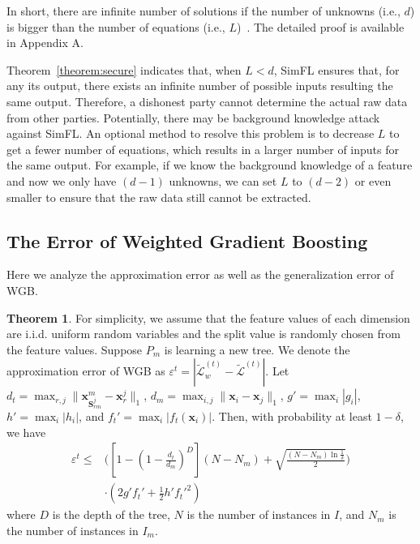 \documentclass[letterpaper]{article} %
\theoremstyle{definition}
\newtheorem{theorem}{Theorem}
\newcommand\norm[1]{\lVert#1\rVert}
\newcommand{\mtx}[1]{\ensuremath{\mathbf{#1}}}
\begin{document}
In short, there are infinite number of solutions if the number of unknowns (i.e., $d$) is bigger than the number of equations (i.e., $L$)~\cite{ladyzhenskaia1968linear}. The detailed proof is available in Appendix A.

Theorem~\ref{theorem:secure} indicates that, when $L<d$, SimFL ensures that, for any its output, there exists an infinite number of possible inputs resulting the same output. Therefore, a dishonest party cannot determine the actual raw data from other parties. Potentially, there may be background knowledge attack against SimFL. An optional method to resolve this problem is to decrease $L$ to get a fewer number of equations, which results in a larger number of inputs for the same output. For example, if we know the background knowledge of a feature and now we only have $(d-1)$ unknowns, we can set $L$ to $(d-2)$ or even smaller to ensure that the raw data  still cannot be extracted.

\subsection{The Error of Weighted Gradient Boosting}
\label{sec:error_formula}
Here we analyze the approximation error as well as the generalization error of WGB.
\begin{theorem}
\label{theorem:upperbound}
For simplicity, we assume that the feature values of each dimension are i.i.d. uniform random variables and the split value is randomly chosen from the feature values. Suppose $P_m$ is learning a new tree. We denote the approximation error of WGB as $\varepsilon^t = |\mathcal{\tilde{L}}_w^{(t)} - \mathcal{\tilde{L}}^{(t)}|$. Let $d_t = \max_{r,j}\norm{\mathbf{x}_{\mtx{S}_{rm}^j}^m-\mathbf{x}_r^j}_1$, $d_{m} = \max_{i,j}\norm{\mathbf{x}_i- \mathbf{x}_j}_1$, $g'=\max_i |g_i|$, $h'=\max_i |h_i|$, and $f_t'=\max_i |f_t(\mathbf{x}_i)|$. Then, with probability at least $1-\delta$, we have
\begin{equation}
\begin{aligned}
\label{eq:upperbound}
    \varepsilon^t \leq &\Big([1-(1-\frac{d_t}{d_m})^D](N-N_m)+\sqrt{\frac{(N-N_m)\ln{\frac{1}{\delta}}}{2}}\Big) \\
    & \cdot (2g' f_t'+\frac{1}{2}h' f_t'^2)
\end{aligned}
\end{equation}
where $D$ is the depth of the tree, $N$ is the number of instances in $I$, and $N_m$ is the number of instances in $I_m$.
\end{theorem}
\end{document}
